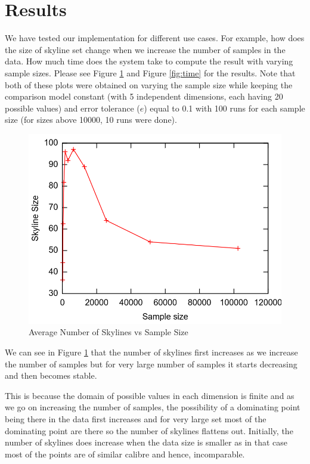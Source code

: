 \documentclass[twocolumn]{article}
\begin{document}
\section{Results}
We have tested our implementation for different use cases. For example, how does the size of skyline set change when we increase the number of samples in the data. How much time does the system take to compute the result with varying sample sizes. Please see Figure \ref{fig:size} and Figure \ref{fig:time} for the results. Note that both of these plots were obtained on varying the sample size while keeping the comparison model constant (with 5 independent dimensions, each having 20 possible values) and error tolerance ($e$) equal to 0.1 with 100 runs for each sample size (for sizes above 10000, 10 runs were done).
 
\begin{figure}[t]
	\centering
	\includegraphics[width=0.98\columnwidth]{skysize.png}
	\caption{Average Number of Skylines vs Sample Size}
	\label{fig:size}
\end{figure}

We can see in Figure \ref{fig:size} that the number of skylines first  increases as we increase the number of samples but for very large number of samples it starts decreasing and then becomes stable. 

This is because the domain of possible values in each dimension is finite and as we go on increasing the number of samples, the possibility of a dominating point being there in the data first increases and for very large set most of the dominating point are there so the number of skylines flattens out. Initially, the number of skylines does increase when the data size is smaller as in that case most of the points are of similar calibre and hence, incomparable.
\end{document}
